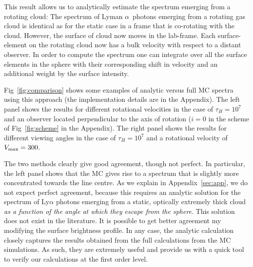 \documentclass{emulateapj}
\newcommand{\lya}{{Lyman $\alpha$~}}
\newcommand{\kms}{{\ifmmode{{\mathrm{\,km\ s}^{-1}}}\else{\,km~s$^{-1}$}\fi}}
\begin{document}
This result allows us to analytically estimate the spectrum emerging from a rotating cloud:
The spectrum of \lya photons emerging from a rotating gas cloud is identical as for the static case in a frame that is co-rotating
with the cloud. However, the surface of cloud now moves in the lab-frame. 
Each surface-element on the rotating cloud now has a bulk
velocity with respect to a distant observer. In order to compute the
spectrum one can integrate over all the surface elements in the
sphere with their corresponding shift in velocity and an additional
weight by the surface intensity.

Fig~\ref{fig:comparison} shows some examples of analytic versus full MC
spectra using this approach (the implementation details are in the Appendix).
The left panel shows the results for different rotational velocities
in the case of $\tau_{H}=10^7$ and an observer located perpendicular
to the axis of rotation ($i=0$ in the scheme of Fig~\ref{fig:scheme}
in the Appendix). The right panel shows the results for different viewing angles in the
case of $\tau_{H}=10^7$ and a rotational velocity of $V_{\rm
  max}=300$\kms. 

The two methods clearly give good agreement, though not perfect.  In particular, the left panel shows that the MC gives rise to a spectrum that is
slightly more concentrated towards the line centre. As we explain in Appendix~\ref{sec:app}, we do not expect perfect agreement, because this requires an analytic solution for the spectrum of Ly$\alpha$ photons emerging from a static, optically extremely thick cloud {\it as a function of the angle at which they escape from the sphere}. This solution does not exist in the literature. It is possible to get better agreement my modifying the surface brightness profile.
In any case, the analytic calculation closely captures the results
obtained from the full calculations from the MC simulations.  
As such, they are extremely useful and provide us with a quick tool to
verify our calculations at the first order level. 
\end{document}
